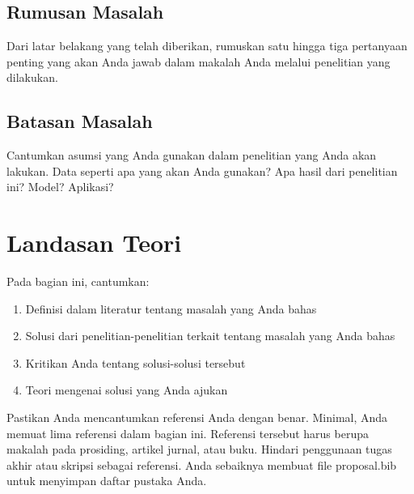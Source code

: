 \documentclass[12pt]{report}
\begin{document}

\section{Rumusan Masalah} %
\label{sec:rumusan_masalah}

Dari latar belakang yang telah diberikan, rumuskan satu hingga tiga pertanyaan penting yang akan Anda jawab dalam makalah Anda melalui penelitian yang dilakukan.


\section{Batasan Masalah} %
\label{sec:batasan_masalah}

Cantumkan asumsi yang Anda gunakan dalam penelitian yang Anda akan lakukan. Data seperti apa yang akan Anda gunakan? Apa hasil dari penelitian ini? Model? Aplikasi?


\chapter{Landasan Teori}

Pada bagian ini, cantumkan:
\begin{enumerate}
    \item Definisi dalam literatur tentang masalah yang Anda bahas
    \item Solusi dari penelitian-penelitian terkait tentang masalah yang Anda bahas
    \item Kritikan Anda tentang solusi-solusi tersebut
    \item Teori mengenai solusi yang Anda ajukan
\end{enumerate}
Pastikan Anda mencantumkan referensi Anda dengan benar. Minimal, Anda memuat lima referensi dalam bagian ini. Referensi tersebut harus berupa makalah pada prosiding, artikel jurnal, atau buku. Hindari penggunaan tugas akhir atau skripsi sebagai referensi. Anda sebaiknya membuat file proposal.bib untuk menyimpan daftar pustaka Anda.




\end{document}
